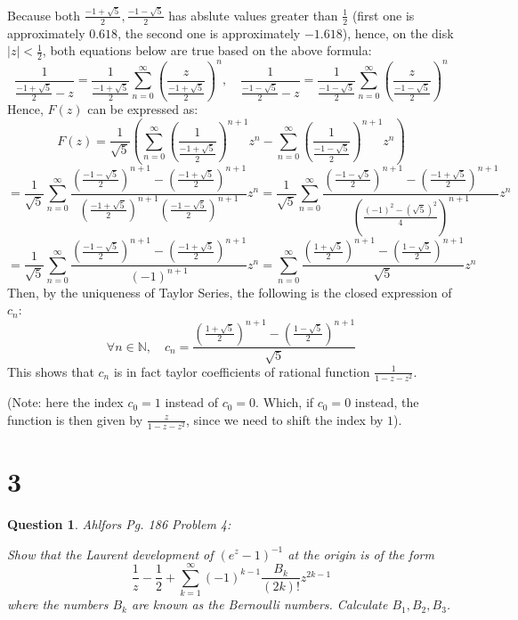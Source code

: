 \documentclass{article}
\newtheorem{question}{Question}
\begin{document}
Because both $\frac{-1+\sqrt{5}}{2},\frac{-1-\sqrt{5}}{2}$ has abslute values greater than $\frac{1}{2}$ (first one is approximately $0.618$, the second one is approximately $-1.618$),
hence, on the disk $|z|<\frac{1}{2}$, both equations below are true based on the above formula:
$$\frac{1}{\frac{-1+\sqrt{5}}{2}-z}=\frac{1}{\frac{-1+\sqrt{5}}{2}}\sum_{n=0}^{\infty}\left(\frac{z}{\frac{-1+\sqrt{5}}{2}}\right)^n,\quad \frac{1}{\frac{-1-\sqrt{5}}{2}-z}=\frac{1}{\frac{-1-\sqrt{5}}{2}}\sum_{n=0}^{\infty}\left(\frac{z}{\frac{-1-\sqrt{5}}{2}}\right)^n$$
Hence, $F(z)$ can be expressed as:
$$F(z)=\frac{1}{\sqrt{5}}\left(\sum_{n=0}^{\infty}\left(\frac{1}{\frac{-1+\sqrt{5}}{2}}\right)^{n+1}z^n-\sum_{n=0}^{\infty}\left(\frac{1}{\frac{-1-\sqrt{5}}{2}}\right)^{n+1}z^n\right)$$
$$=\frac{1}{\sqrt{5}}\sum_{n=0}^{\infty}\frac{\left(\frac{-1-\sqrt{5}}{2}\right)^{n+1}-\left(\frac{-1+\sqrt{5}}{2}\right)^{n+1}}{\left(\frac{-1+\sqrt{5}}{2}\right)^{n+1}\left(\frac{-1-\sqrt{5}}{2}\right)^{n+1}}z^n =\frac{1}{\sqrt{5}}\sum_{n=0}^{\infty}\frac{\left(\frac{-1-\sqrt{5}}{2}\right)^{n+1}-\left(\frac{-1+\sqrt{5}}{2}\right)^{n+1}}{\left(\frac{(-1)^2-(\sqrt{5})^2}{4}\right)^{n+1}}z^n$$
$$=\frac{1}{\sqrt{5}}\sum_{n=0}^{\infty}\frac{\left(\frac{-1-\sqrt{5}}{2}\right)^{n+1}-\left(\frac{-1+\sqrt{5}}{2}\right)^{n+1}}{(-1)^{n+1}}z^n = \sum_{n=0}^{\infty}\frac{\left(\frac{1+\sqrt{5}}{2}\right)^{n+1}-\left(\frac{1-\sqrt{5}}{2}\right)^{n+1}}{\sqrt{5}}z^n$$
Then, by the uniqueness of Taylor Series, the following is the closed expression of $c_n$:
$$\forall n\in\mathbb{N},\quad c_n=\frac{\left(\frac{1+\sqrt{5}}{2}\right)^{n+1}-\left(\frac{1-\sqrt{5}}{2}\right)^{n+1}}{\sqrt{5}}$$
This shows that $c_n$ is in fact taylor coefficients of rational function $\frac{1}{1-z-z^2}$.

(Note: here the index $c_0=1$ instead of $c_0=0$. Which, if $c_0=0$ instead, the function is then given by $\frac{z}{1-z-z^2}$, since we need to shift the index by $1$).

\break

\section*{3}
\begin{myBox}[]{}
    \begin{question}
        Ahlfors Pg. 186 Problem 4:

        Show that the Laurent development of $(e^z-1)^{-1}$ at the origin is of the form
        $$\frac{1}{z}-\frac{1}{2}+\sum_{k=1}^{\infty}(-1)^{k-1}\frac{B_k}{(2k)!}z^{2k-1}$$
        where the numbers $B_k$ are known as the Bernoulli numbers. Calculate $B_1,B_2,B_3$.
    \end{question}
\end{myBox}
\end{document}
